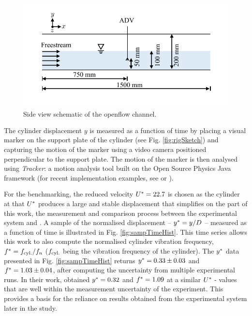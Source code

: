 \documentclass[oneside]{utmthesis}
\begin{document}
\begin{figure}
  \centering
  \includegraphics[width=1\textwidth]{figs/channelSchematic}
  \caption{Side view schematic of the openflow channel.}
  \label{fig:channelSchematic}
\end{figure}

The cylinder displacement $y$ is measured as a function of time by placing a visual marker on the support plate of the cylinder (see Fig. \ref{fig:rigSketch}) and capturing the motion of the marker using a video camera positioned perpendicular to the support plate. The motion of the marker is then analysed using \textit{Tracker}: a motion analysis tool built on the Open Source Physics Java framework (for recent implementation examples, see \citet{Wen2020}  or \citet{Krishnendu2020}).

For the benchmarking, the reduced velocity $U^{*} = 22.7$ is chosen as the cylinder at that $U^{*}$ produces a large and stable displacement that simplifies on the part of this work, the measurement and comparison process between the experimental system and \citet{Koide2013}. A sample of the normalised displacement -- $y^{*} = y/D$ -- measured as a function of time is illustrated in Fig. \ref{fig:sampTimeHist}. This time series allows this work to also compute the normalised cylinder vibration frequency, $f^{*} = f_{\text{cyl.}}/f_{n}$ ($f_{\text{cyl.}}$ being the vibration frequency of the cylinder). The $y^{*}$ data presented in Fig. \ref{fig:sampTimeHist} returns $y^{*} = 0.33 \pm 0.03$ and $f^{*} = 1.03 \pm 0.04$, after computing the uncertainty from multiple experimental runs. In their work, \citet{Koide2013} obtained $y^{*} = 0.32$ and $f^{*} = 1.09$ at a similar $U^{*}$ - values that are well within the measurement uncertainty of the experiment. This provides a basis for the reliance on results obtained from the experimental system later in the study.
\end{document}
